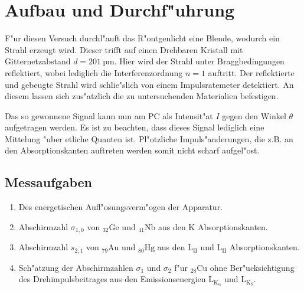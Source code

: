 \section{Aufbau und Durchf"uhrung}
	\label{sec:durchfuehrung}
	F"ur diesen Versuch durchl"auft das R"ontgenlicht eine Blende, wodurch ein Strahl erzeugt wird.
	Dieser trifft auf einen Drehbaren Kristall mit Gitternetzabstand $d = \SI{201}{\pico \meter}$.
	Hier wird der Strahl unter Braggbedingungen reflektiert, wobei lediglich die Interferenzordnung $n = 1$ auftritt.
	Der reflektierte und gebeugte Strahl wird schlie"slich von einem Impulsratemeter detektiert.
	An diesem lassen sich zus"atzlich die zu untersuchenden Materialien befestigen.

	Das so gewonnene Signal kann nun am PC als Intensit"at $I$ gegen den Winkel $\theta$ aufgetragen werden.
	Es ist zu beachten, dass dieses Signal lediglich eine Mittelung "uber etliche Quanten ist.
	Pl"otzliche Impuls"anderungen, die z.B. an den Absorptionskanten auftreten werden somit nicht scharf aufgel"ost.

	\subsection{Messaufgaben}
		\begin{enumerate}
			\item{Des energetischen Aufl"osungsverm"ogen der Apparatur.}
			\item{Abschirmzahl $\sigma_{1,0}$ von ${}_{32} \mathrm{Ge}$ und ${}_{41} \mathrm{Nb}$ aus den K Absorptionskanten.}
			\item{Abschirmzahl $s_{2,1}$ von ${}_{79} \mathrm{Au}$ und ${}_{80} \mathrm{Hg}$ aus den $\mathrm{L}_\mathrm{II}$ und $\mathrm{L}_\mathrm{II}$ Absorptionskanten.}
			\item{Sch"atzung der Abschirmzahlen $\sigma_{1}$ und $\sigma_{2}$ f"ur ${}_{28} \mathrm{Cu}$ ohne Ber"ucksichtigung des Drehimpulsbeitrages aus den Emissionsenergien $\mathrm{L}_\mathrm{K_\mathrm{\alpha}}$ und $\mathrm{L}_\mathrm{K_\mathrm{\beta}}$.}
		\end{enumerate}